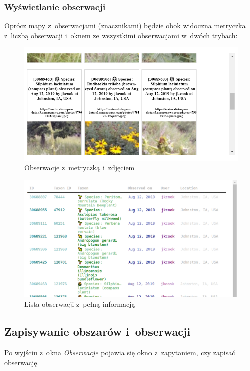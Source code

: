 \documentclass{article}
\begin{document}
\subsubsection{Wyświetlanie obserwacji}

Oprócz mapy z~obserwacjami (znacznikami) będzie obok widoczna metryczka z~liczbą obserwacji i~oknem ze wszystkimi obserwacjami w~dwóch trybach:
\begin{figure}[h] 
\begin{center}
\includegraphics[scale = 0.9]{"ikony.png"}
\end{center}
\caption{Obserwacje z~metryczką i~zdjęciem}
\label{}
\end{figure}

\begin{figure}[h] 
\begin{center}
\includegraphics[scale =.55]{"lista.png"}
\end{center}
\caption{Lista obserwacji z~pełną informacją}
\label{}
\end{figure}

\newpage
\subsection{Zapisywanie obszarów i~obserwacji}
Po wyjściu z~okna \textit{Obserwacje} pojawia się okno z~zapytaniem, czy zapisać obserwację. 
\end{document}
